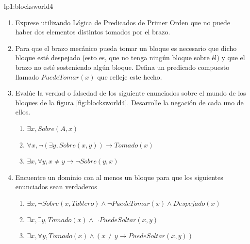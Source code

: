 \begin{defproblem}{lp1:blocksworld4}
\begin{onlyproblem}
		\begin{enumerate}
			\item Exprese utilizando Lógica de Predicados de Primer Orden que no puede haber dos elementos distintos tomados por el brazo.
			\item Para que el brazo mecánico pueda tomar un bloque es necesario que dicho bloque esté despejado (esto es, que no tenga ningún bloque sobre él) y que el brazo no esté sosteniendo algún bloque. Defina un predicado compuesto llamado $ PuedeTomar(x) $ que refleje este hecho.
			\item Evalúe la verdad o falsedad de los siguiente enunciados sobre el mundo de los bloques de la figura \ref{fig:blocksworld4}. Desarrolle la negación de cada uno de ellos.
			\begin{enumerate}
				\item $ \exists x, Sobre(A,x)  $
				\item $ \forall x, \neg (\exists y, Sobre(x,y)) \rightarrow Tomado(x) $
				\item $ \exists x, \forall y, x \neq y \rightarrow \neg Sobre(y, x) $
			\end{enumerate}
			\item Encuentre un dominio con al menos un bloque para que los siguientes enunciados sean verdaderos
			\begin{enumerate}
				\item $ \exists x, \neg Sobre(x, Tablero) \land \neg PuedeTomar(x) \land Despejado(x) $
				\item $ \exists x, \exists y, Tomado(x) \land \neg PuedeSoltar(x,y) $
				\item $ \exists x, \forall y, Tomado(x) \land (x \neq y \rightarrow PuedeSoltar(x,y)) $
			\end{enumerate}
		\end{enumerate}
		

\end{onlyproblem}
\end{defproblem}
